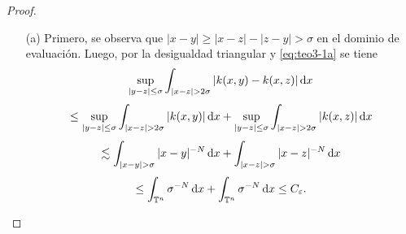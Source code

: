 \begin{proof}
	\begin{itemize}
		\item[(a)] Primero, se observa que $|x-y| \geq |x - z| - |z - y| > \sigma$ en el dominio de evaluación. Luego, por la desigualdad triangular y \cref{eq:teo3-1a} se tiene
		\begin{equation*}
			\sup_{|y-z| \leq \sigma} \int_{|x-z| > 2\sigma}|k(x, y) - k(x, z)|\mathop{}\!\mathrm{d} x  
		\end{equation*}
		\begin{equation*}
			\leq \sup_{|y-z| \leq \sigma} \int_{|x-z| > 2\sigma}|k(x, y)|\mathop{}\!\mathrm{d} x + \sup_{|y-z| \leq \sigma} \int_{|x-z| > 2\sigma}|k(x, z)|\mathop{}\!\mathrm{d} x
		\end{equation*}
		\begin{equation*}
			\lesssim  \int_{|x-y|>\sigma} |x-y|^{-N} \diff x + \int_{|x-z|>\sigma} |x-z|^{-N} \diff x
		\end{equation*}
		\begin{equation*}
			\leq  \int_{\mathbb{T}^n} \sigma^{-N} \mathop{}\!\mathrm{d} x + \int_{\mathbb{T}^n} \sigma^{-N} \mathop{}\!\mathrm{d} x \leq C_\varepsilon.
		\end{equation*}
		

\end{itemize}
\end{proof}
